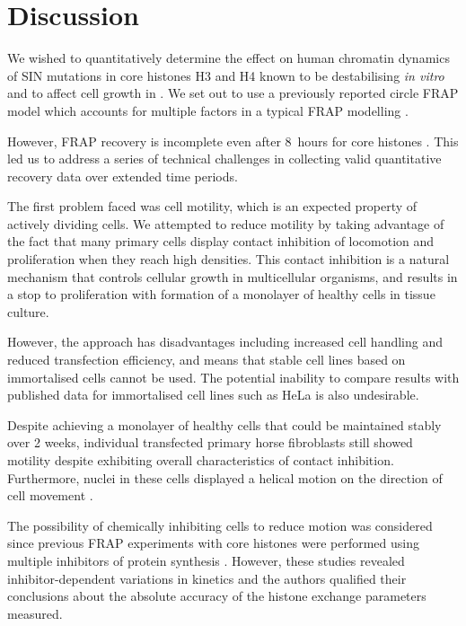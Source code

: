 \section{Discussion}

    We wished to quantitatively determine the
    effect on human chromatin dynamics
    of SIN mutations in core histones H3 and H4 known
    to be destabilising \textit{in vitro} and to affect
    cell growth in .
    We set out to use a previously reported circle FRAP model
    which accounts for multiple factors in a typical
    FRAP modelling \citep{mcnally-frap-code}.

    However, FRAP recovery is incomplete even
    after 8~hours for core histones \citep{KimuraCook}.
    This led us to address a series of technical challenges in
    collecting valid quantitative recovery data over extended time periods.


    The first problem faced was cell motility, which
    is an expected property of actively dividing cells.
    We attempted to reduce motility by taking advantage of
    the fact that many primary cells display contact inhibition of
    locomotion and proliferation when they reach high densities.
    This contact inhibition is a natural mechanism
    that controls cellular growth in
    multicellular organisms, and results in a stop to proliferation
    with formation of a monolayer of healthy cells in tissue culture.

    However, the approach has disadvantages including
    increased cell handling and reduced transfection efficiency,
    and means that stable cell lines based on
    immortalised cells cannot be used.
    The potential inability to compare results with published data for
    immortalised cell lines such as HeLa is also undesirable.

    Despite achieving a monolayer of healthy cells that
    could be maintained stably over 2 weeks,
    individual transfected primary horse fibroblasts still showed motility
    despite exhibiting overall characteristics of contact inhibition.
    Furthermore, nuclei in these cells displayed a helical motion
    on the direction of cell movement .

    The possibility of chemically inhibiting
    cells to reduce motion was considered
    since previous FRAP experiments with core
    histones were performed using multiple inhibitors
    of protein synthesis \citep{KimuraCook}. However, these studies revealed
    inhibitor-dependent variations in kinetics and the authors qualified
    their conclusions about the absolute accuracy
    of the histone exchange parameters measured.

